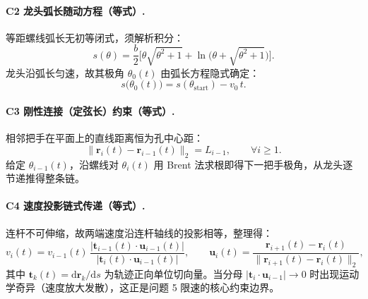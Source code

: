 \documentclass[a4paper, 12pt]{ctexart}
\begin{document}
\paragraph{C2 龙头弧长随动方程（等式）.} 等距螺线弧长无初等闭式，须解析积分\cite{docarmo1976differential}：
\begin{equation}
s(\theta)=\frac{b}{2}\Big[\theta\sqrt{\theta^2+1}+\ln\!\big(\theta+\sqrt{\theta^2+1}\big)\Big].
\label{eq:arclen}
\end{equation}
龙头沿弧长匀速，故其极角 $\theta_0(t)$ 由弧长方程隐式确定：
\begin{equation}
s\big(\theta_0(t)\big)=s(\theta_{\text{start}})-v_0\,t .
\label{eq:c2}
\end{equation}

\paragraph{C3 刚性连接（定弦长）约束（等式）.} 相邻把手在平面上的直线距离恒为孔中心距：
\begin{equation}
\big\|\boldsymbol{r}_i(t)-\boldsymbol{r}_{i-1}(t)\big\|_2=L_{i-1},\qquad \forall i\ge1.
\label{eq:c3}
\end{equation}
给定 $\theta_{i-1}(t)$，沿螺线对 $\theta_i(t)$ 用 Brent 法求根即得下一把手极角\cite{brent1973algorithms}，从龙头逐节递推得整条链。

\paragraph{C4 速度投影链式传递（等式）.} 连杆不可伸缩，故两端速度沿连杆轴线的投影相等，整理得\cite{spong2006robot}：
\begin{equation}
v_i(t)=v_{i-1}(t)\,\frac{\big|\boldsymbol{t}_{i-1}(t)\cdot\boldsymbol{u}_{i-1}(t)\big|}{\big|\boldsymbol{t}_i(t)\cdot\boldsymbol{u}_{i-1}(t)\big|},\qquad
\boldsymbol{u}_i(t)=\frac{\boldsymbol{r}_{i+1}(t)-\boldsymbol{r}_i(t)}{\|\boldsymbol{r}_{i+1}(t)-\boldsymbol{r}_i(t)\|_2},
\label{eq:c4}
\end{equation}
其中 $\boldsymbol{t}_k(t)=\mathrm{d}\boldsymbol{r}_k/\mathrm{d}s$ 为轨迹正向单位切向量。当分母 $|\boldsymbol{t}_i\cdot\boldsymbol{u}_{i-1}|\to0$ 时出现运动学奇异（速度放大发散），这正是问题 5 限速的核心约束边界。
\end{document}
